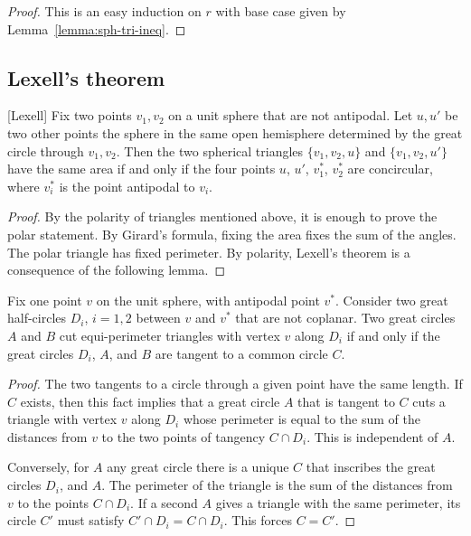 \begin{proof} This is an easy induction on $r$ with base
case given by Lemma~\ref{lemma:sph-tri-ineq}.
\end{proof}

\subsection{Lexell's theorem}

\begin{lemma}[Lexell]
Fix two points $v_1,v_2$ on a unit sphere  that
are not antipodal.
Let $u,u'$ be two other points the sphere in the same open hemisphere determined by the great circle through $v_1,v_2$.  Then the two spherical triangles $\{v_1,v_2,u\}$ and $\{v_1,v_2,u'\}$ have the same area if and only if
the four points $u$, $u'$, $v^*_1$, $v^*_2$ are concircular, where $v^*_i$ is the point antipodal to $v_i$.
\end{lemma}
%
%



\begin{proof}  By the polarity of triangles mentioned above, it is enough to prove the polar statement.  By Girard's formula, fixing the area fixes the sum of the angles.  The polar triangle has fixed perimeter.  By polarity, Lexell's theorem is a consequence of the following lemma.
\end{proof}
%

\begin{lemma}  Fix one point $v$ on the unit sphere, with antipodal point $v^*$.  Consider two great half-circles $D_i$, $i=1,2$ between $v$ and $v^*$ that are not coplanar.  Two great circles $A$ and $B$ cut equi-perimeter triangles with vertex $v$ along $D_i$ if and only if the great circles $D_i$, $A$, and $B$ are tangent to a common circle $C$.
\end{lemma}
%

\begin{proof} The two tangents to a circle through a given point have the same length.  If $C$ exists, then this fact implies that a great circle $A$ that is tangent to $C$ cuts a triangle with vertex $v$ along $D_i$ whose perimeter is equal to the sum of the distances from $v$ to the two points of tangency $C\cap D_i$.  This is independent of $A$.
%
%
%

Conversely, for $A$ any great circle there is a unique $C$ that inscribes the great circles $D_i$, and $A$.  The perimeter of the triangle is the sum of the distances from $v$ to the points $C\cap D_i$.
If a second $A$ gives a triangle with the same perimeter, its circle $C'$
must satisfy $C'\cap D_i = C\cap D_i$.  This forces $C=C'$.
\end{proof}

